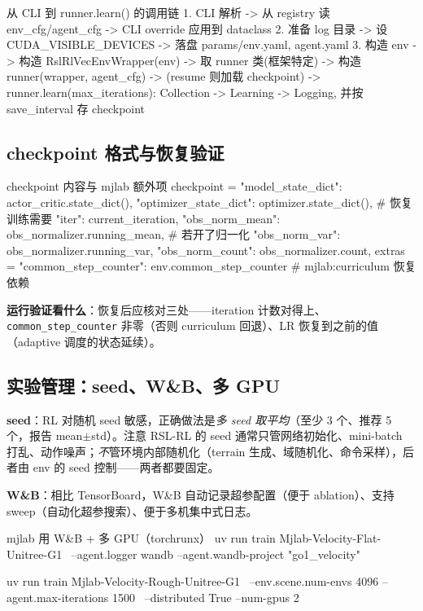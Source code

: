\begin{codebox}[text]{从 CLI 到 runner.learn() 的调用链}
1. CLI 解析 -> 从 registry 读 env_cfg/agent_cfg -> CLI override 应用到 dataclass
2. 准备 log 目录 -> 设 CUDA_VISIBLE_DEVICES -> 落盘 params/env.yaml, agent.yaml
3. 构造 env -> 构造 RslRlVecEnvWrapper(env) -> 取 runner 类(框架特定)
   -> 构造 runner(wrapper, agent_cfg) -> (resume 则加载 checkpoint)
   -> runner.learn(max_iterations):  Collection -> Learning -> Logging,
      并按 save_interval 存 checkpoint
\end{codebox}

\subsection{checkpoint 格式与恢复验证}

\begin{codebox}[Python]{checkpoint 内容与 mjlab 额外项}
checkpoint = {
    "model_state_dict": actor_critic.state_dict(),
    "optimizer_state_dict": optimizer.state_dict(),   # 恢复训练需要
    "iter": current_iteration,
    "obs_norm_mean": obs_normalizer.running_mean,      # 若开了归一化
    "obs_norm_var":  obs_normalizer.running_var,
    "obs_norm_count": obs_normalizer.count,
}
extras = {"common_step_counter": env.common_step_counter}   # mjlab:curriculum 恢复依赖
\end{codebox}

\textbf{运行验证看什么}：恢复后应核对三处——iteration 计数对得上、\verb|common_step_counter| 非零（否则 curriculum 回退）、LR 恢复到之前的值（adaptive 调度的状态延续）。

\subsection{实验管理：seed、W\&B、多 GPU}

\textbf{seed}：RL 对随机 seed 敏感，正确做法是\emph{多 seed 取平均}（至少 3 个、推荐 5 个，报告 mean$\pm$std）。注意 RSL-RL 的 seed 通常只管网络初始化、mini-batch 打乱、动作噪声；\emph{不}管环境内部随机化（terrain 生成、域随机化、命令采样），后者由 env 的 seed 控制——两者都要固定。

\textbf{W\&B}：相比 TensorBoard，W\&B 自动记录超参配置（便于 ablation）、支持 sweep（自动化超参搜索）、便于多机集中式日志。

\begin{codebox}[bash]{mjlab 用 W\&B + 多 GPU（torchrunx）}
uv run train Mjlab-Velocity-Flat-Unitree-G1 \
  --agent.logger wandb --agent.wandb-project "go1_velocity"

uv run train Mjlab-Velocity-Rough-Unitree-G1 \
  --env.scene.num-envs 4096 --agent.max-iterations 1500 \
  --distributed True --num-gpus 2
\end{codebox}

